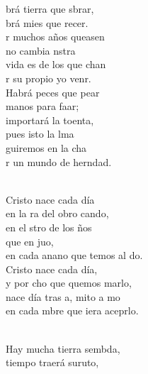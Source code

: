 \documentclass[12pt]{article}
\begin{document}
\begin{multicols*}{2}
\begin{cancion}%
	brá tierra que sbrar,\\
	brá mies que recer.\\
	r muchos años queasen\\
	no cambia nstra \\
	 vida es de los que chan\\
	r su propio yo venr.\\
	Habrá peces que pear\\
	manos para faar;\\
	 importará la toenta,\\
	pues isto la lma\\
	guiremos en la cha\\
	r un mundo de herndad. \\\jump\\
	\begin{chorus}%
Cristo nace cada día\\
	en la ra del obro cando,\\
	en el stro de los ños\\
	que en juo, \\
	en cada anano que temos al do.\\
Cristo nace cada día,\\
	y por cho que quemos marlo,\\
	nace día tras a, mito a mo  \\
	en cada mbre que iera aceprlo.\\
	\end{chorus}%
	\jump\\
	Hay mucha tierra sembda,\\
	 tiempo traerá suruto,\\

\end{cancion}
\end{multicols*}
\end{document}
